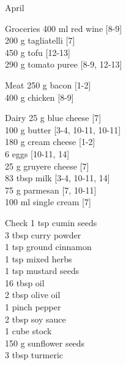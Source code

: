\begin{menu}{April}
\begin{shoppinglist}{Groceries}
      400 ml red wine {\scriptsize[8-9]}\\
      200 g tagliatelli {\scriptsize[7]}\\
      450 g tofu {\scriptsize[12-13]}\\
      290 g tomato puree {\scriptsize[8-9, 12-13]}\\
      \end{shoppinglist}%
      \par\vfil %
      \begin{shoppinglist}{Meat}
      250 g bacon {\scriptsize[1-2]}\\
      400 g chicken {\scriptsize[8-9]}\\
      \end{shoppinglist}%
      \begin{shoppinglist}{Dairy}
      25 g blue cheese {\scriptsize[7]}\\
      100 g butter {\scriptsize[3-4, 10-11, 10-11]}\\
      180 g cream cheese {\scriptsize[1-2]}\\
      6  eggs {\scriptsize[10-11, 14]}\\
      25 g gruyere cheese {\scriptsize[7]}\\
      83 tbsp milk {\scriptsize[3-4, 10-11, 14]}\\
      75 g parmesan {\scriptsize[7, 10-11]}\\
      100 ml single cream {\scriptsize[7]}\\
      \end{shoppinglist}%
      \par\vfil %
      \vfil\clearpage %
      \begin{shoppinglist}{Check}
      1 tsp cumin seeds \\
      3 tbsp curry powder \\
      1 tsp ground cinnamon \\
      1 tsp mixed herbs \\
      1 tsp mustard seeds \\
      16 tbsp oil \\
      2 tbsp olive oil \\
      1 pinch pepper \\
      2 tbsp soy sauce \\
      1 cube stock \\
      150 g sunflower seeds \\
      3 tbsp turmeric \\

\end{shoppinglist}
\end{menu}
